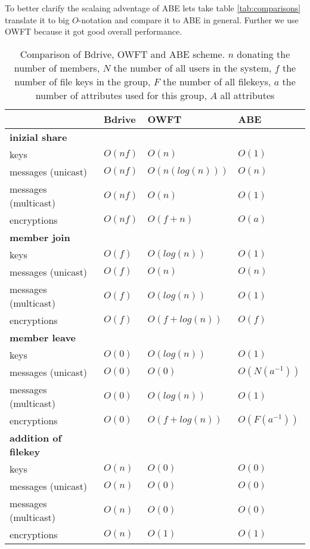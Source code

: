 To better clarify the scalaing adventage of ABE lets take table \ref{tab:comparisons} translate it to big $O$-notation and compare it to ABE in general. Further we use OWFT because it got good overall performance.

\begin{table*}[!ht]
\centering
\begin{tabular}{l 		| l 						| l 						| l }
 						& \textbf{Bdrive}			& \textbf{OWFT} 			& \textbf{ABE} 		\\
\hline
\textbf{inizial share} 																				\\
keys 					& $O(nf)$ 					& $O(n)$	 				& $O(1)$			\\
messages (unicast)		& $O(nf)$  					& $O(n(log(n)))$			& $O(n)$			\\
messages (multicast) 	& $O(nf)$ 					& $O(n)$ 					& $O(1)$			\\
encryptions				& $O(nf)$ 					& $O(f + n)$				& $O(a)$ 			\\
\hline
\textbf{member join} 																				\\
keys 					& $O(f)$   					& $O(log(n))$				& $O(1)$			\\
messages (unicast)		& $O(f)$  					& $O(n)$  					& $O(n)$ 			\\
messages (multicast) 	& $O(f)$ 	 				& $O(log(n))$				& $O(1)$ 			\\
encryptions				& $O(f)$  					& $O(f + log(n))$			& $O(f)$ 			\\
\hline
\textbf{member leave}																				\\
keys 					& $O(0)$					& $O(log(n))$				& $O(1)$			\\
messages (unicast)		& $O(0)$					& $O(0)$  					& $O(N(a^{-1}))$	\\
messages (multicast)	& $O(0)$					& $O(log(n))$				& $O(1)$ 			\\ 
encryptions 			& $O(0)$					& $O(f + log(n))$ 			& $O(F(a^{-1}))$	\\
\hline	
\textbf{addition of filekey}																		\\
keys 					& $O(n)$	 				& $O(0)$					& $O(0)$			\\
messages (unicast)		& $O(n)$	 				& $O(0)$					& $O(0)$			\\
messages (multicast)	& $O(n)$ 					& $O(0)$ 					& $O(0)$			\\
encryptions				& $O(n)$ 					& $O(1)$					& $O(1)$			\\
\hline
\end{tabular}
\caption{Comparison of Bdrive, OWFT and ABE scheme. $n$ donating the number of members, $N$ the number of all users in the system, $f$ the number of file keys in the group, $F$ the number of all filekeys, $a$ the number of attributes used for this group, $A$ all attributes }
\label{tab:comparisonsOWFTtoABE}
\end{table*}

